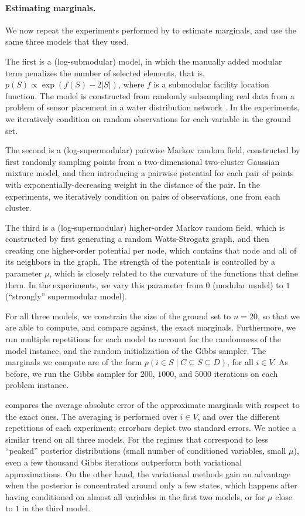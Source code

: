 \paragraph{Estimating marginals.}
We now repeat the experiments performed by \cite{djolonga14} to estimate marginals, and use the same three models that they used.

The first is a (log-submodular) \flid{} model, in which the manually added modular term penalizes the number of selected elements, that is, $p(S) \propto \exp(f(S)-2|S|)$, where $f$ is a submodular facility location function.
The model is constructed from randomly subsampling real data from a problem of sensor placement in a water distribution network \citep{krause08}.
In the experiments, we iteratively condition on random observations for each variable in the ground set.

The second is a (log-supermodular) pairwise Markov random field, constructed by first randomly sampling points from a two-dimensional two-cluster Gaussian mixture model, and then introducing a pairwise potential for each pair of points with exponentially-decreasing weight in the distance of the pair.
In the experiments, we iteratively condition on pairs of observations, one from each cluster.

The third is a (log-supermodular) higher-order Markov random field, which is constructed by first generating a random Watts-Strogatz graph, and then creating one higher-order potential per node, which contains that node and all of its neighbors in the graph.
The strength of the potentials is controlled by a parameter $\mu$, which is closely related to the curvature of the functions that define them.
In the experiments, we vary this parameter from $0$ (modular model) to $1$ (``strongly'' supermodular model).

For all three models, we constrain the size of the ground set to $n = 20$, so that we are able to compute, and compare against, the exact marginals.
Furthermore, we run multiple repetitions for each model to account for the randomness of the model instance, and the random initialization of the Gibbs sampler.
The marginals we compute are of the form $p(i \in S \mid C \subseteq S \subseteq D)$, for all $i \in V$.
As before, we run the Gibbs sampler for $200$, $1000$, and $5000$ iterations on each problem instance.

 compares the average absolute error of the approximate marginals with respect to the exact ones.
The averaging is performed over $i \in V$, and over the different repetitions of each experiment; errorbars depict two standard errors.
We notice a similar trend on all three models.
For the regimes that correspond to less ``peaked'' posterior distributions (small number of conditioned variables, small $\mu$), even a few thousand Gibbs iterations outperform both variational approximations.
On the other hand, the variational methods gain an advantage when the posterior is concentrated around only a few states, which happens after having conditioned on almost all variables in the first two models, or for $\mu$ close to $1$ in the third model.

